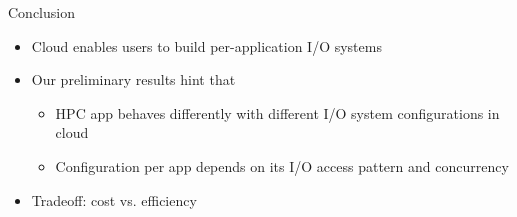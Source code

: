 \documentclass{beamer}
\begin{document}
\begin{frame}{Conclusion}
    \begin{itemize}
        \item Cloud enables users to build per-application I/O systems
        \item Our preliminary results hint that
            \begin{itemize}
                \item HPC app behaves differently with different I/O system
                    configurations in cloud
                \item Configuration per app depends on its I/O access pattern
                    and concurrency
            \end{itemize}
        \item Tradeoff: cost vs. efficiency
        \pause
        \begin{center}\end{center}
    \end{itemize}
\end{frame}
\end{document}
